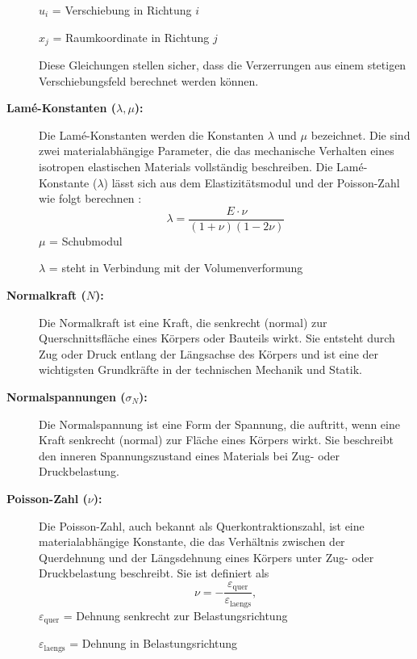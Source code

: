 \begin{description}
	$u_i$ = Verschiebung in Richtung $i$
	
	$x_j$ = Raumkoordinate in Richtung $j$
	
Diese Gleichungen stellen sicher, dass die Verzerrungen aus einem stetigen Verschiebungsfeld berechnet werden können.

\item[\textbf{Lamé-Konstanten ($\lambda{,\mu}$):}] Die Lamé-Konstanten werden die Konstanten $\lambda$ und $\mu$ bezeichnet. 
Die sind zwei materialabhängige Parameter, die das mechanische Verhalten eines isotropen elastischen Materials vollständig beschreiben.
Die Lamé-Konstante ($\lambda$) lässt sich aus dem Elastizitätsmodul und der Poisson-Zahl wie folgt berechnen \cite{elastomechanik:Grundlagen_der_Elastizitaetstheorie}:
\begin{equation}
	\lambda = 
	\frac{E \cdot \nu}{(1 + \nu)(1 - 2\nu)}
\end{equation}
$\mu$ = Schubmodul

$\lambda$ = steht in Verbindung mit der Volumenverformung
	
\item[\textbf{Normalkraft ($N$):}] Die Normalkraft ist eine Kraft, die senkrecht (normal) zur Querschnittsfläche eines Körpers oder Bauteils wirkt. 
Sie entsteht durch Zug oder Druck entlang der Längsachse des Körpers und ist eine der wichtigsten Grundkräfte in der technischen Mechanik und Statik.
	
\item[\textbf{Normalspannungen ($\sigma_N$):}] Die Normalspannung ist eine Form der Spannung, die auftritt, wenn eine Kraft senkrecht (normal) zur Fläche eines Körpers wirkt. 
Sie beschreibt den inneren Spannungszustand eines Materials bei Zug- oder Druckbelastung.
	
\item[\textbf{Poisson-Zahl ($\nu$):}] Die Poisson-Zahl, auch bekannt als Querkontraktionszahl, ist eine materialabhängige Konstante, die das Verhältnis zwischen der Querdehnung und der Längsdehnung eines Körpers unter Zug- oder Druckbelastung beschreibt.
Sie ist definiert als
	\begin{equation}
		\nu=
		-\frac{\varepsilon_\text{quer}}{\varepsilon_\text{laengs}},
	\end{equation}
	$\varepsilon_\text{quer}$ = Dehnung senkrecht zur Belastungsrichtung
	
	$\varepsilon_\text{laengs}$ = Dehnung in Belastungsrichtung
	

\end{description}

